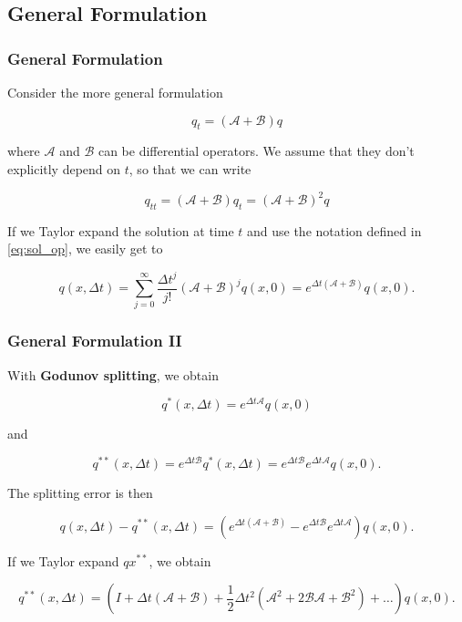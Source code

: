 \documentclass{beamer}
\newcommand{\ca}{\mathcal{A}}
\newcommand{\cb}{\mathcal{B}}
\renewcommand{\d}{\Delta}
\renewcommand{\emph}[1]{\textcolor{tum}{\textbf{#1}}}
\begin{document}
\subsection{General Formulation}
\begin{frame}
	\frametitle{General Formulation}
	Consider the more general formulation

	\begin{equation}
		q_t = (\ca+\cb)q
	\end{equation}

	where $\ca$ and $\cb$ can be differential operators. We assume that they don't explicitly depend on $t$, so that we can write

	\begin{equation}
		q_{tt} = (\ca+\cb)q_t=(\ca+\cb)^2q
	\end{equation}

	If we Taylor expand the solution at time $t$ and use the notation defined in \eqref{eq:sol_op}, we easily get to

	\begin{equation}\label{eq:exp_unsplit}
		q(x,\d t) = \sum_{j=0}^{\infty}\frac{\d t^j}{j!}(\ca + \cb)^jq(x,0) = e^{\d t(\ca +\cb)}q(x,0).
	\end{equation}


\end{frame}

\begin{frame}
	\frametitle{General Formulation II}
	With \emph{Godunov splitting}, we obtain

	\begin{equation}
		q^*(x,\d t)=e^{\d t \ca}q(x,0)
	\end{equation}

	and

	\begin{equation}
		q^{**}(x,\d t)=e^{\d t \cb}q^*(x,\d t) = e^{\d t \cb}e^{\d t \ca}q(x,0).
	\end{equation}

	The splitting error is then

	\begin{equation}
		q(x,\d t)-q^{**}(x,\d t) = (e^{\d t(\ca +\cb)}-e^{\d t \cb}e^{\d t \ca})q(x,0).
	\end{equation}

	If we Taylor expand $qx^{**}$, we obtain

	\begin{equation}\label{eq:exp_split}
		q^{**}(x,\d t) = (I+\d t(\ca + \cb)+\frac{1}{2}\d t^2(\ca^2+2\cb\ca+\cb^2)+\dots)q(x,0).
	\end{equation}

\end{frame}
\end{document}
